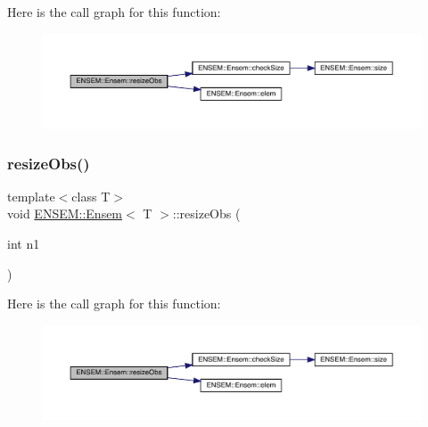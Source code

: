 Here is the call graph for this function\+:
\nopagebreak
\begin{figure}[H]
\begin{center}
\leavevmode
\includegraphics[width=350pt]{d7/d3e/classENSEM_1_1Ensem_a20ee27dffc4b1db635103ce40fb0d5c2_cgraph}
\end{center}
\end{figure}
\mbox{\label{classENSEM_1_1Ensem_a20ee27dffc4b1db635103ce40fb0d5c2}} 
\subsubsection{\texorpdfstring{resizeObs()}{resizeObs()}\hspace{0.1cm}{\footnotesize\ttfamily [3/12]}}
{\footnotesize\ttfamily template$<$class T$>$ \\
void \mbox{\hyperlink{classENSEM_1_1Ensem}{E\+N\+S\+E\+M\+::\+Ensem}}$<$ T $>$\+::resize\+Obs (\begin{DoxyParamCaption}\item[{int}]{n1 }\end{DoxyParamCaption})\hspace{0.3cm}{\ttfamily [inline]}}

Here is the call graph for this function\+:
\nopagebreak
\begin{figure}[H]
\begin{center}
\leavevmode
\includegraphics[width=350pt]{d7/d3e/classENSEM_1_1Ensem_a20ee27dffc4b1db635103ce40fb0d5c2_cgraph}
\end{center}
\end{figure}
\mbox{\label{classENSEM_1_1Ensem_af74074307267e421a53a3e9e9e2449fc}} 
